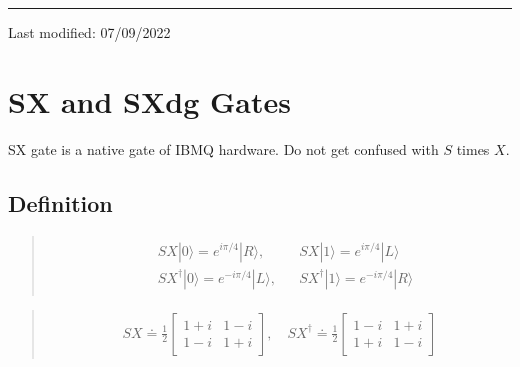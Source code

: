 \documentclass[letterpaper,10pt,english]{jupyterBook}
\begin{document}
\bigskip\hrule\bigskip


\sphinxAtStartPar
Last modified: 07/09/2022

\sphinxstepscope


\section{SX and SXdg Gates}
\label{\detokenize{q1gates/sx:sx-and-sxdg-gates}}\label{\detokenize{q1gates/sx:sec-sxgate}}\label{\detokenize{q1gates/sx::doc}}
\sphinxAtStartPar
SX gate is a native gate of IBMQ hardware. Do not get confused with \(S\) times \(X\).

\sphinxAtStartPar
{}


\subsection{Definition}
\label{\detokenize{q1gates/sx:definition}}
\sphinxAtStartPar
{}
\begin{quote}
\begin{equation*}
\begin{split}
\begin{align}
&SX |0\rangle = e^{i\pi/4}|R\rangle,  &&SX |1\rangle = e^{i\pi/4}|L\rangle\\
&SX^\dagger |0\rangle = e^{-i\pi/4}|L\rangle, &&SX^\dagger |1\rangle = e^{-i\pi/4}|R\rangle
\end{align}
\end{split}
\end{equation*}\end{quote}

\sphinxAtStartPar
{}
\begin{quote}
\begin{equation}\label{equation:q1gates/sx:SXGate-matrix}
\begin{split}
SX \doteq \frac{1}{2} \begin{bmatrix} 1+i & 1-i \\ 1-i & 1+i \end{bmatrix}, \quad
SX^\dagger \doteq \frac{1}{2} \begin{bmatrix} 1-i & 1+i \\ 1+i & 1-i \end{bmatrix}
\end{split}
\end{equation}\end{quote}
\end{document}
